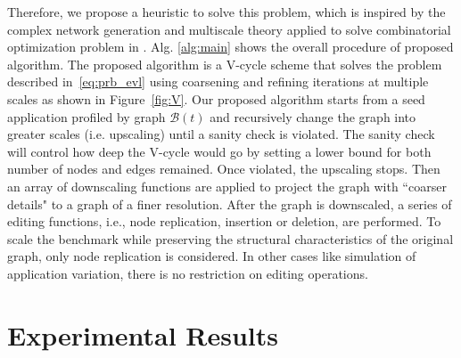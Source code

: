 \indent Therefore, we propose a heuristic to solve this problem, which is inspired by the complex network generation and multiscale theory applied to solve combinatorial optimization problem in \cite{ron2011relaxation}. Alg. \ref{alg:main} shows the overall procedure of proposed algorithm. The proposed algorithm is a V-cycle scheme that solves the problem described in~\eqref{eq:prb_evl} using coarsening and refining iterations at multiple scales as shown in Figure~\ref{fig:V}. Our proposed algorithm starts from a seed application profiled by graph $\mathcal B(t)$ and recursively change the graph into greater scales (i.e. upscaling) until a sanity check is violated. The sanity check will control how deep the V-cycle would go by setting a lower bound for both number of nodes and edges remained. Once violated, the upscaling stops. Then an array of downscaling functions are applied to project the graph with ``coarser details" to a graph of a finer resolution. After the graph is downscaled,  a series of editing functions, i.e., node replication, insertion or deletion, are performed. To scale the benchmark while preserving the structural characteristics of the original graph, only node replication is considered. In other cases like simulation of application variation, there is no restriction on editing operations. 
\section{Experimental Results}


